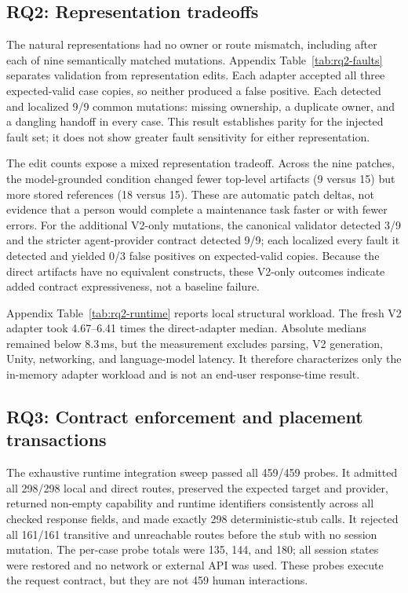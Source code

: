 \subsection{RQ2: Representation tradeoffs}

The natural representations had no owner or route mismatch, including after
each of nine semantically matched mutations. Appendix
Table~\ref{tab:rq2-faults} separates validation from representation edits.
Each adapter accepted all three
expected-valid case copies, so neither produced a false positive. Each detected
and localized 9/9 common mutations: missing ownership, a duplicate owner, and a
dangling handoff in every case. This result establishes parity for the injected
fault set; it does not show greater fault sensitivity for either
representation.

The edit counts expose a mixed representation tradeoff. Across the nine
patches, the model-grounded condition changed fewer top-level artifacts
(9 versus 15) but more stored references (18 versus 15). These are automatic
patch deltas, not evidence that a person would complete a maintenance task
faster or with fewer errors. For the additional V2-only mutations, the
canonical validator detected 3/9 and the stricter agent-provider contract
detected 9/9; each localized every fault it detected and yielded 0/3 false
positives on expected-valid copies. Because the direct artifacts have no
equivalent constructs, these V2-only outcomes indicate added contract
expressiveness, not a baseline failure.

Appendix Table~\ref{tab:rq2-runtime} reports local structural workload. The
fresh V2 adapter took 4.67--6.41 times the direct-adapter median. Absolute
medians remained below 8.3\,ms, but the measurement excludes parsing,
V2 generation, Unity, networking, and language-model latency. It therefore
characterizes only the in-memory adapter workload and is not an end-user
response-time result.

\subsection{RQ3: Contract enforcement and placement transactions}

The exhaustive runtime integration sweep passed all 459/459 probes. It admitted
all 298/298 local and direct routes, preserved the expected target and provider,
returned non-empty capability and runtime identifiers consistently across all
checked response fields, and made exactly 298 deterministic-stub calls. It
rejected all 161/161 transitive and unreachable routes before the stub with no
session mutation. The per-case probe totals were 135, 144, and 180; all session
states were restored and no network or external API was used. These probes
execute the request contract, but they are not 459 human interactions.

